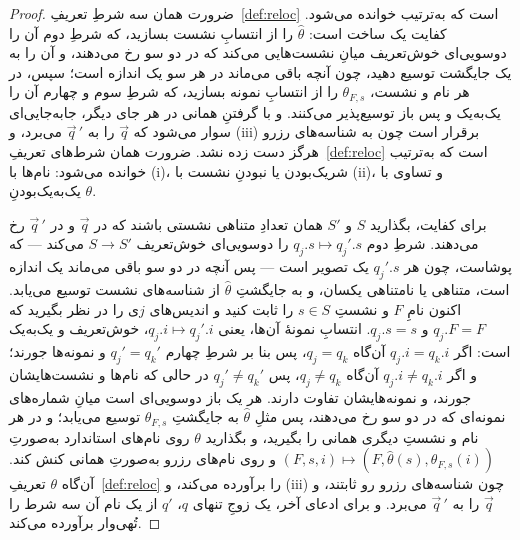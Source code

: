 \documentclass[10pt,oneside,openany]{book}
\theoremstyle{accentdef}
\theoremstyle{accentplain}
\begin{document}
\begin{proof}
ضرورت همان سه شرطِ تعریفِ~\ref{def:reloc} است که به‌ترتیب خوانده می‌شود.
کفایت یک ساخت است: $\hat\theta$ را از انتسابِ نشست بسازید، که شرطِ دوم آن
را دوسویی‌ای خوش‌تعریف میانِ نشست‌هایی می‌کند که در دو سو رخ می‌دهند، و آن
را به یک جایگشت توسیع دهید، چون آنچه باقی می‌ماند در هر سو یک اندازه است؛
سپس، در هر نام و نشست، $\theta_{F,s}$ را از انتسابِ نمونه بسازید، که شرطِ
سوم و چهارم آن را یک‌به‌یک و پس باز توسیع‌پذیر می‌کنند. و با گرفتنِ همانی در
هر جای دیگر، جابه‌جایی‌ای سوار می‌شود که $\vec q$ را به $\vec q\,'$ می‌برد،
و (iii) برقرار است چون به شناسه‌های رزرو هرگز دست زده نشد.
ضرورت همان شرط‌های تعریفِ~\ref{def:reloc} است که به‌ترتیب خوانده می‌شود:
نام‌ها با (i)، شریک‌بودن یا نبودنِ نشست با (ii)، و تساوی با یک‌به‌یک‌بودنِ
$\theta$.

برای کفایت، بگذارید $S$ و $S'$ همان تعدادِ متناهی نشستی باشند که در $\vec q$
و در $\vec q\,'$ رخ می‌دهند. شرطِ دوم $q_j.s \mapsto q_j'.s$ را دوسویی‌ای
خوش‌تعریف $S \to S'$ می‌کند --- که پوشاست، چون هر $q_j'.s$ یک تصویر است ---
پس آنچه در دو سو باقی می‌ماند یک اندازه است، متناهی یا نامتناهی یکسان، و به
جایگشتِ $\hat\theta$ از شناسه‌های نشست توسیع می‌یابد. اکنون نامِ $F$ و نشستِ
$s \in S$ را ثابت کنید و اندیس‌های $j$ی را در نظر بگیرید که $q_j.F = F$ و
$q_j.s = s$. انتسابِ نمونهٔ آن‌ها، یعنی $q_j.i \mapsto q_j'.i$، خوش‌تعریف و
یک‌به‌یک است: اگر $q_j.i = q_k.i$ آن‌گاه $q_j = q_k$، پس بنا بر شرطِ چهارم
$q_j' = q_k'$ و نمونه‌ها جورند؛ و اگر $q_j.i \neq q_k.i$ آن‌گاه $q_j \neq
q_k$، پس $q_j' \neq q_k'$ در حالی که نام‌ها و نشست‌هایشان جورند، و
نمونه‌هایشان تفاوت دارند. هر یک باز دوسویی‌ای است میانِ شماره‌های نمونه‌ای
که در دو سو رخ می‌دهند، پس مثلِ $\hat\theta$ به جایگشتِ $\theta_{F,s}$
توسیع می‌یابد؛ و در هر نام و نشستِ دیگری همانی را بگیرید، و بگذارید $\theta$
روی نام‌های استاندارد به‌صورتِ $(F,s,i) \mapsto
(F,\hat\theta(s),\theta_{F,s}(i))$ و روی نام‌های رزرو به‌صورتِ همانی کنش
کند. آن‌گاه $\theta$ تعریفِ~\ref{def:reloc} را برآورده می‌کند، و (iii) چون
شناسه‌های رزرو رو ثابتند، و $\vec q$ را به $\vec q\,'$ می‌برد. و برای ادعای
آخر، یک زوجِ تنهای $q$، $q'$ از یک نام آن سه شرط را تُهی‌وار برآورده
می‌کند.
\end{proof}
\end{document}
